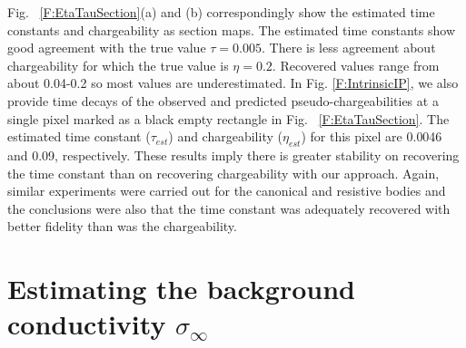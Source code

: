 \documentclass[extra,mreferee]{gji}
\newcommand{\siginf}{\sigma_\infty}
\begin{document}
Fig. ~\ref{F:EtaTauSection}(a) and (b) correspondingly show the estimated time constants and chargeability as section maps.
The estimated time constants show good agreement with the true value $\tau= 0.005$. 
There is less agreement about chargeability for which the true value is $\eta=0.2$. Recovered values range from about 0.04-0.2 so most values are underestimated. 
In Fig. \ref{F:IntrinsicIP}, we also provide time decays of the observed and predicted pseudo-chargeabilities at a single pixel marked as a black empty rectangle in Fig. ~\ref{F:EtaTauSection}. The estimated time constant ($\tau_{est}$) and chargeability ($\eta_{est}$) for this pixel are 0.0046 and 0.09, respectively. 
These results imply there is greater  stability on recovering the time constant than on recovering chargeability with our approach. Again, similar experiments were carried out for the canonical and resistive bodies and the conclusions were also that the time constant was adequately recovered with better fidelity than was the chargeability.  

\section{Estimating the background conductivity $\siginf$}
 
\end{document}
